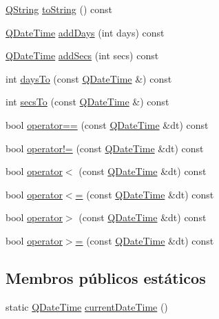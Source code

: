 \begin{DoxyCompactItemize}
\item 
\hyperlink{class_q_string}{Q\-String} \hyperlink{class_q_date_time_a8aabbf2e3c7be33fa5769a5eab3eef6f}{to\-String} () const 
\item 
\hyperlink{class_q_date_time}{Q\-Date\-Time} \hyperlink{class_q_date_time_a6d8c67d4432acad9f0a92a599f809e37}{add\-Days} (int days) const 
\item 
\hyperlink{class_q_date_time}{Q\-Date\-Time} \hyperlink{class_q_date_time_a36f825b6e25fbf7595f93e8020d97c9f}{add\-Secs} (int secs) const 
\item 
int \hyperlink{class_q_date_time_a15706508d381f2194b3c84d770d05cea}{days\-To} (const \hyperlink{class_q_date_time}{Q\-Date\-Time} \&) const 
\item 
int \hyperlink{class_q_date_time_a06d2ad72d253989ee3307407f0170371}{secs\-To} (const \hyperlink{class_q_date_time}{Q\-Date\-Time} \&) const 
\item 
bool \hyperlink{class_q_date_time_a09b0c841ef89c24075646d37737c9f3e}{operator==} (const \hyperlink{class_q_date_time}{Q\-Date\-Time} \&dt) const 
\item 
bool \hyperlink{class_q_date_time_a9488a857f8a3dbd4f5895efec811ed65}{operator!=} (const \hyperlink{class_q_date_time}{Q\-Date\-Time} \&dt) const 
\item 
bool \hyperlink{class_q_date_time_a944abc7ab3238992823f53ab70cbe1d5}{operator$<$} (const \hyperlink{class_q_date_time}{Q\-Date\-Time} \&dt) const 
\item 
bool \hyperlink{class_q_date_time_a4db4f1f1a2ebb7e1b5fefa8197eb4369}{operator$<$=} (const \hyperlink{class_q_date_time}{Q\-Date\-Time} \&dt) const 
\item 
bool \hyperlink{class_q_date_time_a935991a47a7029a279bd9f2652659969}{operator$>$} (const \hyperlink{class_q_date_time}{Q\-Date\-Time} \&dt) const 
\item 
bool \hyperlink{class_q_date_time_ae96cdd5d99cc73ecefa339e85ba6dbbe}{operator$>$=} (const \hyperlink{class_q_date_time}{Q\-Date\-Time} \&dt) const 
\end{DoxyCompactItemize}
\subsection*{Membros públicos estáticos}
\begin{DoxyCompactItemize}
\item 
static \hyperlink{class_q_date_time}{Q\-Date\-Time} \hyperlink{class_q_date_time_a5ca9c2823edb0ed2e50376ae331705f5}{current\-Date\-Time} ()
\end{DoxyCompactItemize}
